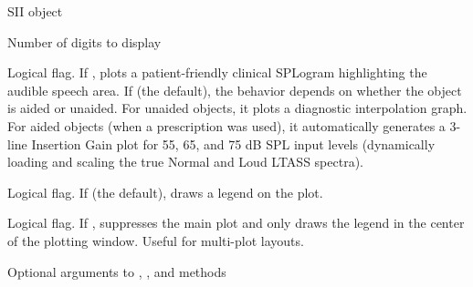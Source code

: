\documentclass[letterpaper]{book}
\begin{document}
\begin{Arguments}
\begin{ldescription}
\item[\code{object}, \code{x}] SII object
\item[\code{digits}] Number of digits to display
\item[\code{clinical}] Logical flag. If , plots a patient-friendly clinical SPLogram highlighting the audible speech area. If  (the default), the behavior depends on whether the object is aided or unaided. For unaided objects, it plots a diagnostic interpolation graph. For aided objects (when a prescription was used), it automatically generates a 3-line Insertion Gain plot for 55, 65, and 75 dB SPL input levels (dynamically loading and scaling the true Normal and Loud LTASS spectra).
\item[\code{legend}] Logical flag. If  (the default), draws a legend on the plot.
\item[\code{legend\_only}] Logical flag. If , suppresses the main plot and only draws the legend in the center of the plotting window. Useful for multi-plot layouts.
\item[\code{...}] Optional arguments to , , and
 methods
\end{ldescription}
\end{Arguments}
%
\end{document}
